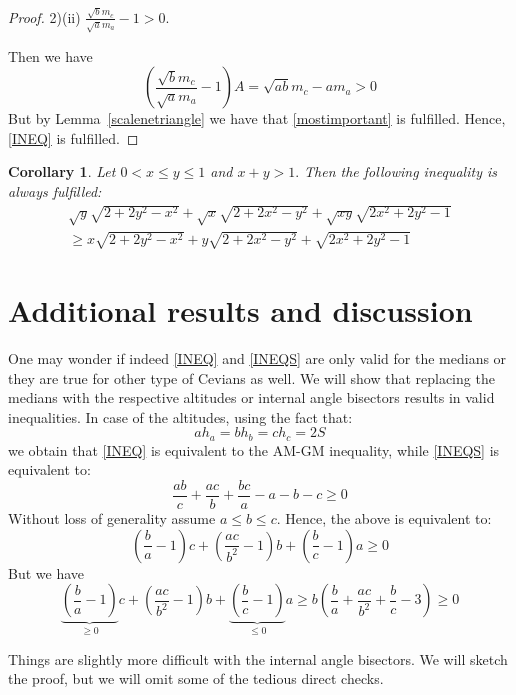 \documentclass[a4paper,12pt]{article}
\newtheorem{corollary}{Corollary}
\begin{document}
\begin{proof}
2)(ii) $\frac{\sqrt{b}m_c}{\sqrt{a}m_a}-1 > 0.$

Then we have 
\[
\left(\frac{\sqrt{b}m_c}{\sqrt{a}m_a}-1\right)A = \sqrt{ab}m_c-am_a >0
\]
But by Lemma~\ref{scalenetriangle} we have that \eqref{mostimportant} is fulfilled.
Hence, \eqref{INEQ} is fulfilled.
\end{proof}

\begin{corollary}\label{twovars} Let $0<x\leq y \leq 1$ and $x+y >1.$ Then the following inequality is always fulfilled:
\begin{align*}
\sqrt{y}\sqrt{2+2y^2-x^2}+\sqrt{x}\sqrt{2+2x^2-y^2}+\sqrt{xy}\sqrt{2x^2+2y^2-1}\\
\geq x\sqrt{2+2y^2-x^2}+y\sqrt{2+2x^2-y^2}+\sqrt{2x^2+2y^2-1} 
\end{align*}
\end{corollary}

\section{Additional results and discussion}

One may wonder if indeed \eqref{INEQ} and \eqref{INEQS} are only valid for the medians or they are true for other type of Cevians as well. We will show that replacing the medians with the respective altitudes or internal angle bisectors results in valid inequalities. In case of the altitudes, using the fact that:
\[
ah_a=bh_b=ch_c=2S
\]
we obtain that \eqref{INEQ} is equivalent to the AM-GM inequality, while \eqref{INEQS} is equivalent to:
\[
\frac{ab}{c}+\frac{ac}{b}+\frac{bc}{a}-a-b-c \geq 0
\]
Without loss of generality assume $a\leq b \leq c.$ Hence,
the above is equivalent to:
\[
\left(\frac{b}{a}-1\right)c+\left(\frac{ac}{b^2}-1\right)b+\left(\frac{b}{c}-1\right) a \geq 0
\]
But we have
\[
\underbrace{\left(\frac{b}{a}-1\right)}_{\geq 0}c+\left(\frac{ac}{b^2}-1\right)b+\underbrace{\left(\frac{b}{c}-1\right)}_{\leq 0} a \geq  b \left(\frac{b}{a}+\frac{ac}{b^2}+\frac{b}{c}-3\right) \geq 0
\]

Things are slightly more difficult with the internal angle bisectors. We will sketch the proof, but we will omit some of the tedious direct checks. 
\end{document}

